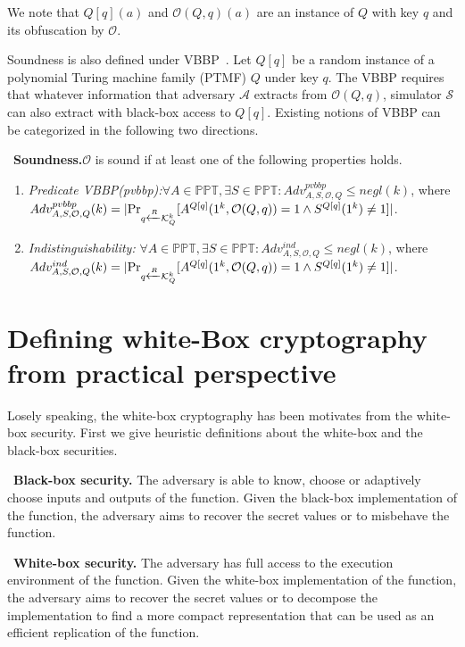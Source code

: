 \documentclass{SCIS2018}
\begin{document}
We note that $Q[q](a)$ and $\mathcal{O}(Q,q)(a)$ are an instance of $Q$ with key $q$ and its obfuscation by $\mathcal{O}$.

Soundness is also defined under VBBP~\cite{DBLP:conf/crypto/BarakGIRSVY01}. Let $Q[q]$ be a random instance of a polynomial Turing machine family (PTMF) $Q$ under key $q$. The VBBP requires that whatever information that adversary $\mathcal{A}$ extracts from $\mathcal{O}(Q,q)$, simulator $\mathcal{S}$ can also extract with black-box access to $Q[q]$. Existing notions of VBBP can be categorized in the following two directions.

\cite{DBLP:conf/isw/SaxenaWP09}~\textbf{Soundness.}{$\mathcal{O}$ is sound if at least one of the following properties holds.}
\begin{enumerate}
\item \textit{Predicate VBBP(pvbbp):}$\forall A\in \mathbb{PPT}, \exists S \in \mathbb{PPT}: Adv_{A, S, \mathcal{O}, Q}^{pvbbp} \leq negl(k)$, where \\ $Adv_{A, S, \mathcal{O}, Q}^{pvbbp}(k) =|\textmd{Pr}_{q \xleftarrow{R} \mathcal{K}^{k}_{Q}}[A^{Q[q]}(1^{k},\mathcal{O}(Q,q))=1 \wedge S^{Q[q]}(1^{k})\neq 1]|$.

\item \textit{Indistinguishability:} $\forall A\in \mathbb{PPT}, \exists S \in \mathbb{PPT}: Adv_{A, S, \mathcal{O}, Q}^{ind} \leq negl(k)$, where \\ $Adv_{A, S, \mathcal{O}, Q}^{ind}(k) =|\textmd{Pr}_{q \xleftarrow{R} \mathcal{K}^{k}_{Q}}[A^{Q[q]}(1^{k},\mathcal{O}(Q,q))=1 \wedge S^{Q[q]}(1^{k})\neq 1]|$.
\end{enumerate}

\section{Defining white-Box cryptography from practical perspective}
Losely speaking, the white-box cryptography has been motivates from the white-box security. First we give heuristic definitions about the white-box and the black-box securities.

~\textbf{Black-box security.} {The adversary is able to know, choose or adaptively choose inputs and outputs of the function. Given the black-box implementation of the function, the adversary aims to recover the secret values or to misbehave the function.}

~\textbf{White-box security.} {The adversary has full access to the execution environment of the function. Given the white-box implementation of the function, the adversary aims to recover the secret values or to decompose the implementation to find a more compact representation that can be used as an efficient replication of the function.}
\end{document}
